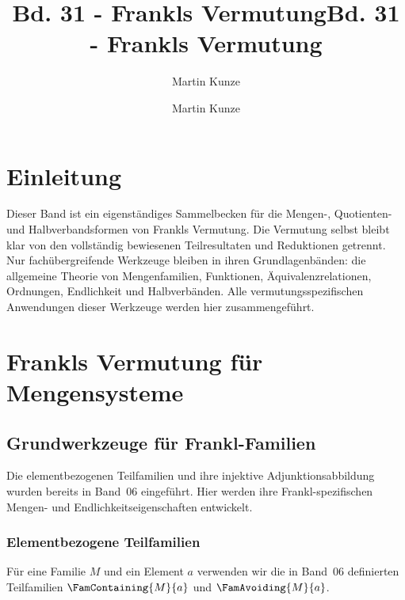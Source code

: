 \documentclass[main.tex]{subfiles}
\title{Bd. 31 - Frankls Vermutung}
\author{Martin Kunze}
\date{}
\begin{document}
\title{Bd. 31 - Frankls Vermutung}
\author{Martin Kunze}
\date{}
\hypersetup{pageanchor=false}
\maketitle
\hypersetup{pageanchor=true}
\setcounter{tocdepth}{3}
\tableofcontents
\setcounter{file}{31}
\renewcommand{\FormulaBandID}{31}
\newcommand{\ProofRefStack}[1]{%
  \ensuremath{\begin{gathered}#1\end{gathered}}}

\chapter{Einleitung}

Dieser Band ist ein eigenständiges Sammelbecken für die Mengen-, Quotienten-
und Halbverbandsformen von Frankls Vermutung. Die Vermutung selbst bleibt
klar von den vollständig bewiesenen Teilresultaten und Reduktionen getrennt.
Nur fachübergreifende Werkzeuge bleiben in ihren Grundlagenbänden: die
allgemeine Theorie von Mengenfamilien, Funktionen, Äquivalenzrelationen,
Ordnungen, Endlichkeit und Halbverbänden. Alle vermutungsspezifischen
Anwendungen dieser Werkzeuge werden hier zusammengeführt.

\chapter{Frankls Vermutung für Mengensysteme}

\section{Grundwerkzeuge für Frankl-Familien}

Die elementbezogenen Teilfamilien und ihre injektive Adjunktionsabbildung
wurden bereits in Band~06 eingeführt. Hier werden ihre
Frankl-spezifischen Mengen- und Endlichkeitseigenschaften entwickelt.

\subsection{Elementbezogene Teilfamilien}

Für eine Familie \(M\) und ein Element \(a\) verwenden wir die in Band~06
definierten Teilfamilien \(\FamContaining{M}{a}\) und
\(\FamAvoiding{M}{a}\).

\begin{tabproof}
\end{tabproof}
\end{document}

